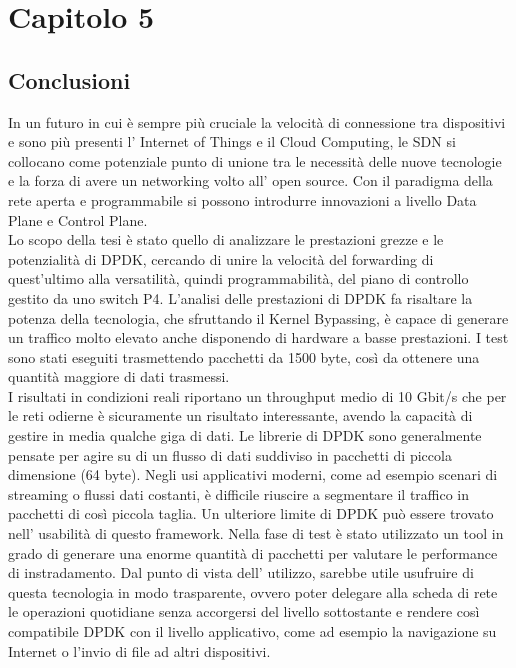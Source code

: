 \chapter*{Capitolo 5}

\section*{Conclusioni}


In un futuro in cui è sempre più cruciale la velocità di connessione tra dispositivi e sono più presenti l' Internet of Things e il Cloud Computing, le SDN si collocano come potenziale punto di unione tra le necessità delle nuove tecnologie e la forza di avere un networking volto all' open source. Con il paradigma della rete aperta e programmabile si possono introdurre innovazioni a livello Data Plane e Control Plane.\\
\newline 
Lo scopo della tesi è stato quello di analizzare le prestazioni grezze e le potenzialità di DPDK, cercando di unire la velocità del forwarding di quest'ultimo alla versatilità, quindi programmabilità, del piano di controllo gestito da uno switch P4. 
L'analisi delle prestazioni di DPDK fa risaltare la potenza della tecnologia, che sfruttando il Kernel Bypassing, è capace di generare un traffico molto elevato anche disponendo di hardware a basse prestazioni. I test sono stati eseguiti trasmettendo pacchetti da 1500 byte, così da ottenere una quantità maggiore di dati trasmessi.\\
\newline
I risultati in condizioni reali riportano un throughput medio di 10 Gbit/s che per le reti odierne è sicuramente un risultato interessante, avendo la capacità di gestire in media qualche giga di dati. 
Le librerie di DPDK sono generalmente pensate per agire su di un flusso di dati suddiviso in pacchetti di piccola dimensione (64 byte). Negli usi applicativi moderni, come ad esempio scenari di streaming o flussi dati costanti, è difficile riuscire a segmentare il traffico in pacchetti di così piccola taglia.
Un ulteriore limite di DPDK può essere trovato nell' usabilità di questo framework. Nella fase di test è stato utilizzato un tool in grado di generare una enorme quantità di pacchetti per valutare le performance di instradamento. Dal punto di vista dell' utilizzo, sarebbe utile usufruire di questa tecnologia in modo trasparente, ovvero poter delegare alla scheda di rete le operazioni quotidiane senza accorgersi del livello sottostante e rendere così compatibile DPDK con il livello applicativo, come ad esempio la navigazione su Internet o l'invio di file ad altri dispositivi.\\
